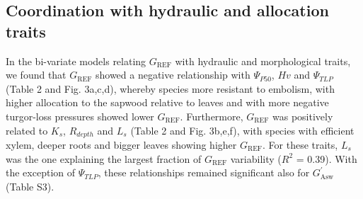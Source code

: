 \documentclass[11pt,twoside]{reedthesis}
\begin{document}
\subsection{Coordination with hydraulic and allocation
traits}\label{coordination-with-hydraulic-and-allocation-traits}

In the bi-variate models relating \(G_{\text{REF}}\) with hydraulic and
morphological traits, we found that \(G_{\text{REF}}\) showed a negative
relationship with \textbar{}\(\Psi_{P50}\)\textbar{}, \(Hv\) and
\textbar{}\(\Psi_{TLP}\)\textbar{} (Table 2 and Fig. 3a,c,d), whereby
species more resistant to embolism, with higher allocation to the
sapwood relative to leaves and with more negative turgor-loss pressures
showed lower \(G_{\text{REF}}\). Furthermore, \(G_{\text{REF}}\) was
positively related to \(K_s\), \(R_{depth}\) and \(L_s\) (Table 2 and
Fig. 3b,e,f), with species with efficient xylem, deeper roots and bigger
leaves showing higher \(G_{\text{REF}}\). For these traits, \(L_s\) was
the one explaining the largest fraction of \(G_{\text{REF}}\)
variability (\(R^2\) = 0.39). With the exception of \(\Psi_{TLP}\),
these relationships remained significant also for \(G_{\text{Asw}}^{'}\)
(Table S3).\par
\end{document}
